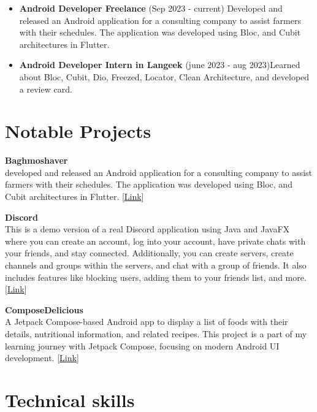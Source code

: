 \documentclass[a4paper,10pt]{article} %
\begin{document}
\begin{itemize}
    \item \textbf{Android Developer Freelance } (Sep 2023 - current) \newline
    Developed and released an Android application for a consulting company to assist farmers with their schedules. The application was developed using Bloc, and Cubit architectures in Flutter. 
    \item \textbf{Android Developer Intern in Langeek} (june 2023 - aug 2023)\newline Learned about Bloc, Cubit, Dio, Freezed, Locator, Clean Architecture, and developed a review card.
\end{itemize}


\section{Notable Projects}  

\begin{small}

\textbf{Baghmoshaver}\\
developed and released an Android application for a consulting company to assist farmers with their schedules. The application was developed using Bloc, and Cubit architectures in Flutter. [\href{https://cafebazaar.ir/app/com.example.bagh_moshaver}{Link}]
\end{small}

\textbf{Discord}\\
This is a demo version of a real Discord application using Java and JavaFX where you can create an account, log into
your account, have private chats with your friends, and stay connected. Additionally, you can
create servers, create channels and groups within the servers, and chat with a group of friends. It also
includes features like blocking users, adding them to your friends list, and more.
[\href{https://github.com/Aliamrol/Discord}{Link}]

\textbf{ComposeDelicious}\\
A Jetpack Compose-based Android app to display a list of foods with their details, nutritional information, and related recipes. This project is a part of my learning journey with Jetpack Compose, focusing on modern Android UI development.
[\href{https://github.com/Aliamrol/ComposeDelicious}{Link}]


\section{Technical skills} 
\end{document}
